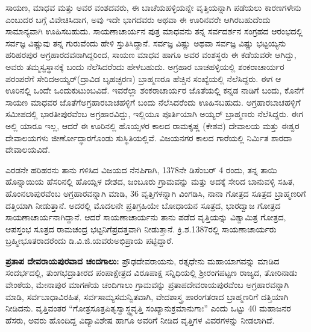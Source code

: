 ಸಾಯಣ, ಮಾಧವ ಮತ್ತು ಅವರ ವಂಶದವರು, ಈ ಬಾಚೆಯಹಳ್ಳಿಯನ್ನೇ ವೃತ್ತಿಯನ್ನಾಗಿ ಪಡೆಯಲು ಕಾರಣ\-ಗಳೇನು ಎಂಬುದರ ಬಗ್ಗೆ ವಿವೇಚಿಸಿದಾಗ, ಅವು ಇದೇ ಭಾಗದವರು ಅಥವಾ ಈ ಊರಿನವರೇ ಆಗಿರಬಹುದೆಂದು ಸಾಮಾನ್ಯವಾಗಿ ಊಹಿಸಬಹುದು. ಸಾಯಣಾಚಾರ್ಯನ ಪುತ್ರ ಮಾಧವನು ತನ್ನ ಸರ್ವದರ್ಶನ ಸಂಗ್ರಹದ ಆರಂಭದಲ್ಲಿ ಸರ್ವಜ್ಞ ವಿಷ್ಣುವು ತನ್ನ ಗುರುವೆಂದು ಹೇಳಿ ಸ್ತುತಿಸಿದ್ದಾನೆ. ಸರ್ವಜ್ಞ ವಿಷ್ಣು ಅಥವಾ ಸರ್ವಜ್ಞ ವಿಷ್ಣು ಭಟ್ಟಯ್ಯನು ಹರಿಹರಪುರ ಅಗ್ರಹಾರದವನಾಗಿದ್ದರಿಂದ, ಸಾಯಣ ಮಾಧವ ಹಾಗೂ ಅವರ ವಂಶಸ್ಥರು ಈ ಕಡೆಯವರೇ ಆಗಿದ್ದು, ಅವರು ತಮ್ಮ\break ಸ್ವಸ್ಥಾನಕ್ಕೆ ಬಂದು ನೆಲೆಸಿದರೆಂದು ಹೇಳಬಹುದು. ಅಗ್ರಹಾರ ಬಾಚಹಳ್ಳಿಯಲ್ಲಿ ಶಂಕರಾಚಾರ್ಯರ ಪರಂಪರೆಗೆ ಸೇರಿದ\break ಅಯ್ಯರ್​(ದ್ರಾವಿಡ ಬೃಹಚ್ಛರಣ) ಬ್ರಾಹ್ಮಣರೂ ಹೆಚ್ಚಿನ ಸಂಖ್ಯೆಯಲ್ಲಿ ನೆಲೆಸಿದ್ದರು. ಈಗ ಆ ಊರಿನಲ್ಲಿ ಒಂದೇ ಒಂದು\break ಕುಟುಂಬವಿದೆ. ಇವರೆಲ್ಲಾ ಶಂಕರಾಚಾರ್ಯರ ಜೊತೆಯಲ್ಲಿ ಕನ್ನಡ ನಾಡಿಗೆ ಬಂದು, ಕೊನೆಗೆ ಸಾಯಣ ಮಾಧವರ ಜೊತೆಗೆ\break ಅಗ್ರಹಾರಬಾಚಹಳ್ಳಿಗೆ ಬಂದು ನೆಲೆಸಿದರೆಂದು ಊಹಿಸಬಹುದು. ಅಗ್ರಹಾರಬಾಚಹಳ್ಳಿಗೆ ಸಮೀಪದಲ್ಲಿ ಭಾರತೀಪುರವೆಂಬ ಅಗ್ರಹಾರವಿದ್ದು, ಇಲ್ಲಿಯೂ ಪೂರ್ತಿಯಾಗಿ ಅಯ್ಯರ್​ ಬ್ರಾಹ್ಮಣರು ನೆಲೆಸಿದ್ದರು. ಈಗ ಅಲ್ಲಿ ಯಾರೂ ಇಲ್ಲ, ಆದರೆ ಈ ಊರಿನಲ್ಲಿ ಹೊಯ್ಸಳರ ಕಾಲದ ರಾಮಕೃಷ್ಣ (ಕೇಶವ) ದೇವಾಲಯ ಮತ್ತು ಈಶ್ವರ ದೇವಾಲಯಗಳು ಜೀರ್ಣೋದ್ಧಾರ\-ಗೊಂಡು ಸುಸ್ಥಿತಿಯಲ್ಲಿವೆ. ವಿಜಯನಗರ ಕಾಲದ ಗಾರೆಯಲ್ಲಿ ನಿರ್ಮಿತ ಶಾರದಾ ದೇವಾಲಯವಿದೆ.

ಎರಡನೇ ಹರಿಹರನು ತಾನು ಗಳಿಸಿದ ವಿಜಯದ ನೆನಪಿಗಾಗಿ, 1378ನೇ ಡಿಸೆಂಬರ್​ 4 ರಂದು, ತನ್ನ ತಾಯಿ ಹೊನ್ನಾಯಿಯ ಹೆಸರಿನಲ್ಲಿ ಹೊಯ್ಸಳ ದೇಶದ, ಜಂಬೂರು ಗ್ರಾಮವನ್ನು ಮತ್ತು ಅದಕ್ಕೆ ಸೇರಿದ ಬಾನುವಳ್ಳಿ ಸಹಿತ, ಹೊಂನಲಾಪುರವೆಂಬ ಅಗ್ರಹಾರವನ್ನಾಗಿ ಮಾಡಿ, 36 ವೃತ್ತಿಗಳನ್ನಾಗಿ ವಿಂಗಡಿಸಿ, ನಾನಾ ಗೋತ್ರದ ಸೂತ್ರದ ಬ್ರಾಹ್ಮಣರಿಗೆ ದತ್ತಿಯಾಗಿ ನೀಡುತ್ತಾನೆ. ಅದರಲ್ಲಿ ಮೊದಲನೇ ಪ್ರತಿಗ್ರಹಿಯೇ ಬೋಧಾಯನ ಸೂತ್ರದ, ಭಾರದ್ವಾಜ ಗೋತ್ರದ ಸಾಯಣಾಚಾರ್ಯನಾಗಿದ್ದಾನೆ. ಆದರೆ ಸಾಯಣಾಚಾರ್ಯನು ತಾನು ಪಡೆದ ವೃತ್ತಿಯನ್ನು ವಿಶ್ವಾಮಿತ್ರ ಗೋತ್ರದ, ಆಪಸ್ತಂಭ ಸೂತ್ರದ ರಾಮಚಂದ್ರ ಭಟ್ಟನಿಗೆ\break ಪ್ರದತ್ತವಾಗಿ ನೀಡುತ್ತಾನೆ. ಕ್ರಿ.ಶ.1387ರಲ್ಲಿ ಸಾಯಣಾಚಾರ್ಯರು ಬ್ರಹ್ಮೀಭೂತರಾದರೆಂದು ಡಿ.ವಿ.ಜಿ.ಯವರು\break ಅಭಿಪ್ರಾಯ ಪಟ್ಟಿದ್ದಾರೆ.

\vskip 3pt

\textbf{ಪ್ರತಾಪ ದೇವರಾಯಪುರವಾದ ಚಂದಗಾಲು:} ಪ್ರೌಢದೇವರಾಯನು, ರತ್ನಧೇನು ಮಹಾಯಾಗವನ್ನು ಮಾಡಿದ ಸಂದರ್ಭದಲ್ಲಿ, ತುಂಗಭದ್ರಾತೀರದ ಪಂಪಾಕ್ಷೇತ್ರದ ವಿರೂಪಾಕ್ಷ ಸನ್ನಿಧಿಯಲ್ಲಿ ಶ‍್ರೀರಂಗಪಟ್ಟಣ ರಾಜ್ಯದ, ತೋರಿನಾಡು ವೇಂಠೆಯ, ಮೇನಾಪುರ ಮಾಗಣೆಯ ಚಂದಿಗಾಲು ಗ್ರಾಮವನ್ನು ಪ್ರತಾಪದೇವರಾಯಪುರವೆಂಬ ಅಗ್ರಹಾರವನ್ನಾಗಿ ಮಾಡಿ, ಸರ್ವಬಾಧಾವಿರಹಿತ, ಸರ್ವಸಾಮ್ಯಸಮನ್ವಿತವಾಗಿ, ವೇದಶಾಸ್ತ್ರ ಪಾರಂಗತರಾದ ಬ್ರಾಹ್ಮಣರಿಗೆ ದತ್ತಿಯಾಗಿ ನೀಡಿದನು. ವೃತ್ತಿವಂತರ “ಗೋತ್ರಸೂತ್ರಪಿತೃಸ್ವಾಸ್ಥ್ಯವೃತ್ತಿ ಸಂಖ್ಯಾನುಕ್ರಮಾನುಗಾಃ” ಎಂದು ಒಟ್ಟು 40 ಮಹಾಜನರ ಹೆಸರು, ಅವರು ಹೊಂದಿದ್ದ ವಿದ್ಯಾವಿಶೇಷ ಹಾಗೂ ಅವರಿಗೆ ನೀಡಿದ ವೃತ್ತಿಗಳ ವಿವರಗಳನ್ನು ನೀಡಲಾಗಿದೆ.

